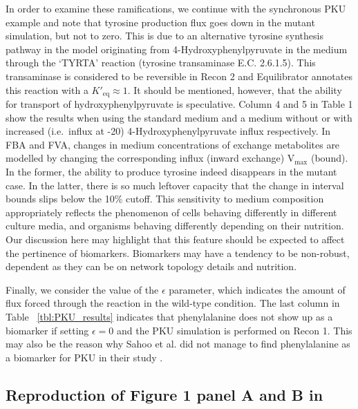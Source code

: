 \documentclass[10pt,a4paper,onecolumn]{article}
\begin{document}
In order to examine these ramifications, we continue with the
synchronous PKU example and note that tyrosine production flux goes down
in the mutant simulation, but not to zero. This is due to an alternative
tyrosine synthesis pathway in the model originating from
4-Hydroxyphenylpyruvate in the medium through the `TYRTA' reaction
(tyrosine transaminase E.C. 2.6.1.5). This transaminase is considered to
be reversible in Recon 2 and Equilibrator \autocite{Noor2012} annotates
this reaction with a \(K'_{\text{eq}} \approx 1\). It should be
mentioned, however, that the ability for transport of
hydroxyphenylpyruvate is speculative. Column 4 and 5 in Table 1 show the
results when using the standard medium and a medium without or with
increased (i.e.~influx at -20) 4-Hydroxyphenylpyruvate influx
respectively. In FBA and FVA, changes in medium concentrations of
exchange metabolites are modelled by changing the corresponding influx
(inward exchange) V\(_{\text{max}}\) (bound). In the former, the ability
to produce tyrosine indeed disappears in the mutant case. In the latter,
there is so much leftover capacity that the change in interval bounds
slips below the 10\% cutoff. This sensitivity to medium composition
appropriately reflects the phenomenon of cells behaving differently in
different culture media, and organisms behaving differently depending on
their nutrition. Our discussion here may highlight that this feature
should be expected to affect the pertinence of biomarkers. Biomarkers
may have a tendency to be non-robust, dependent as they can be on
network topology details and nutrition.

Finally, we consider the value of the \(\epsilon\) parameter, which
indicates the amount of flux forced through the reaction in the
wild-type condition. The last column in Table ~\ref{tbl:PKU_results}
indicates that phenylalanine does not show up as a biomarker if setting
\(\epsilon = 0\) and the PKU simulation is performed on Recon 1. This
may also be the reason why Sahoo et al. did not manage to find
phenylalanine as a biomarker for PKU in their study
\autocite{Sahoo2012}.

\subsection{\texorpdfstring{Reproduction of Figure 1 panel A and B in
\autocite{Shlomi2009}}{Reproduction of Figure 1 panel A and B in {[}@Shlomi2009{]}}}\label{reproduction-of-figure-1-panel-a-and-b-in-shlomi2009}
\end{document}
